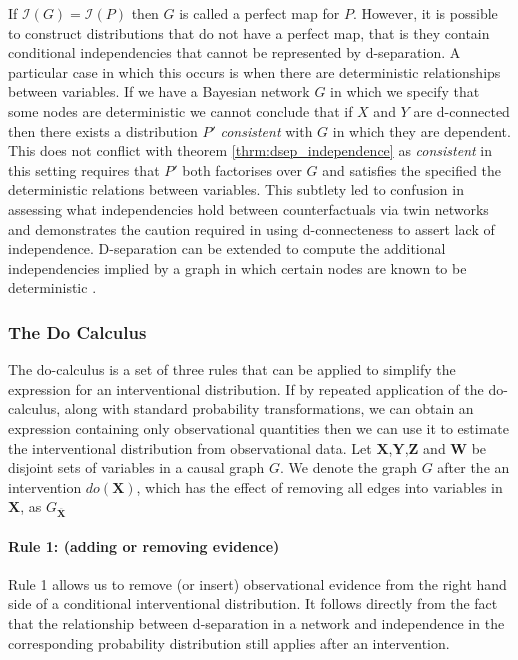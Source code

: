 \documentclass[11pt,a4paper,oneside]{book}
\newcommand{\indep}[1]{\mathcal{I}\left(#1\right)}
\theoremstyle{plain}
\theoremstyle{definition}
\begin{document}
If $\indep{G} = \indep{P}$ then $G$ is called a perfect map for $P$. However, it is possible to construct distributions that do not have a perfect map, that is they contain conditional independencies that cannot be represented by d-separation. A particular case in which this occurs is when there are deterministic relationships between variables. If we have a Bayesian network $G$ in which we specify that some nodes are deterministic we cannot conclude that if $X$ and $Y$ are d-connected then there exists a distribution $P'$ \emph{consistent} with $G$ in which they are dependent. This does not conflict with theorem \ref{thrm:dsep_independence} as \emph{consistent} in this setting requires that $P'$ both factorises over $G$ and satisfies the specified the deterministic relations between variables. This subtlety led to confusion in assessing what independencies hold between counterfactuals via twin networks \citep{Pearl2000,Richardson2013} and demonstrates the caution required in using d-connecteness to assert lack of independence. D-separation can be extended to compute the additional independencies implied by a graph in which certain nodes are known to be deterministic \citep{Geiger1990}. 

\subsubsection{The Do Calculus} 
\label{sec:do_calculus}

The do-calculus is a set of three rules \citep{Pearl1995} that can be applied to simplify the expression for an interventional distribution. If by repeated application of the do-calculus, along with standard probability transformations, we can obtain an expression containing only observational quantities then we can use it to estimate the interventional distribution from observational data. Let $\boldsymbol{X}$,$\boldsymbol{Y}$,$\boldsymbol{Z}$ and $\boldsymbol{W}$ be disjoint sets of variables in a causal graph $G$. We denote the graph $G$ after the an intervention $do(\boldsymbol{X})$, which has the effect of removing all edges into variables in $\boldsymbol{X}$, as $G_{\overline{\boldsymbol{X}}}$

\paragraph{Rule 1: (adding or removing evidence)} 

Rule 1 allows us to remove (or insert) observational evidence from the right hand side of a conditional interventional distribution. It follows directly from the fact that the relationship between d-separation in a network and independence in the corresponding probability distribution still applies after an intervention. 
\end{document}
